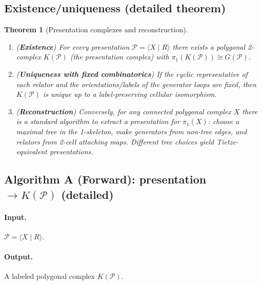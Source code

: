\documentclass[11pt]{article}
\newtheorem{theorem}{Theorem}[section]
\theoremstyle{definition}
\theoremstyle{plain}
\theoremstyle{remark}
\begin{document}
\subsection*{Existence/uniqueness (detailed theorem)}
\begin{theorem}[Presentation complexes and reconstruction]\label{thm:poly}
\begin{enumerate}[leftmargin=2.2em]
\item (\textbf{Existence}) For every presentation $\mathcal P=\langle X\mid R\rangle$ there exists a polygonal 2-complex $K(\mathcal P)$ (the presentation complex)
with $\pi_1(K(\mathcal P))\cong G(\mathcal P)$.

\item (\textbf{Uniqueness with fixed combinatorics}) If the cyclic representative of each relator and the orientations/labels of the generator loops are fixed,
then $K(\mathcal P)$ is unique up to a label-preserving cellular isomorphism.

\item (\textbf{Reconstruction}) Conversely, for any connected polygonal complex $X$ there is a standard algorithm to extract a presentation for $\pi_1(X)$:
choose a maximal tree in the 1-skeleton, make generators from non-tree edges, and relators from 2-cell attaching maps.
Different tree choices yield Tietze-equivalent presentations.
\end{enumerate}
\end{theorem}

\subsection*{Algorithm A (Forward): presentation $\to K(\mathcal P)$ (detailed)}\cite{hatcher2002,bridsonhaefliger1999}
\paragraph{Input.} $\mathcal P=\langle X\mid R\rangle$.
\paragraph{Output.} A labeled polygonal complex $K(\mathcal P)$.
\end{document}
